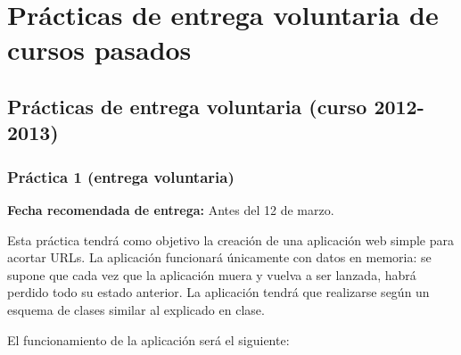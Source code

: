 \section{Prácticas de entrega voluntaria de cursos pasados}


\subsection{Prácticas de entrega voluntaria (curso 2012-2013)}

\subsubsection{Práctica 1 (entrega voluntaria)}
\label{subsec:practica-vol-1-2012}

\textbf{Fecha recomendada de entrega:} Antes del 12 de marzo.

Esta práctica tendrá como objetivo la creación de una aplicación web simple para acortar URLs. La aplicación funcionará únicamente con datos en memoria: se supone que cada vez que la aplicación muera y vuelva a ser lanzada, habrá perdido todo su estado anterior. La aplicación tendrá que realizarse según un esquema de clases similar al explicado en clase.

El funcionamiento de la aplicación será el siguiente:

